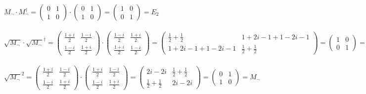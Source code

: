 \documentclass[a4paper]{scrartcl}
\begin{document}
\noindent$M_{\neg}\cdot M_{\neg}^{\dagger}=\begin{pmatrix} 0 & 1\\ 1 & 0\end{pmatrix}\cdot \begin{pmatrix} 0 & 1\\ 1 & 0\end{pmatrix}= \begin{pmatrix} 1 & 0\\ 0 & 1\end{pmatrix}=E_2$\\\\

\noindent$\sqrt{M_{\neg}}\cdot\sqrt{M_\neg}^\dagger=\begin{pmatrix} \frac{1+i}{2} & \frac{1-i}{2}\\ \frac{1-i}{2} & \frac{1+i}{2}\end{pmatrix}\cdot \begin{pmatrix} \frac{1-i}{2} & \frac{1+i}{2}\\ \frac{1+i}{2} & \frac{1-i}{2}\end{pmatrix}= \begin{pmatrix} \frac{1}{2}+\frac{1}{2} & 1+2i-1+1-2i-1\\ 1+2i-1+1-2i-1 & \frac{1}{2}+\frac{1}{2}\end{pmatrix}=\begin{pmatrix} 1 & 0 \\ 0 & 1\end{pmatrix} =E_2$\\\\

\noindent$\sqrt{M_\neg}^2= \begin{pmatrix}\frac{1+i}{2} & \frac{1-i}{2} \\ \frac{1-i}{2} & \frac{1+i}{2}\end{pmatrix}\cdot \begin{pmatrix}\frac{1+i}{2} & \frac{1-i}{2} \\ \frac{1-i}{2} & \frac{1+i}{2}\end{pmatrix}= \begin{pmatrix}2i-2i & \frac{1}{2}+ \frac{1}{2} \\ \frac{1}{2}+ \frac{1}{2} & 2i-2i \end{pmatrix}= \begin{pmatrix} 0 & 1 \\ 1 & 0\end{pmatrix}= M_\neg$

\newpage
\end{document}
